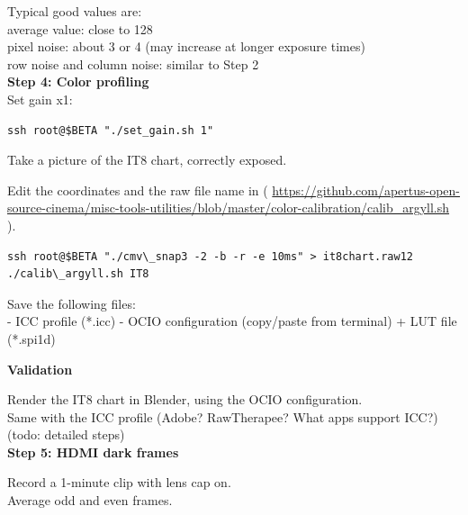 Typical good values are:\\

average value: close to 128\\

pixel noise: about 3 or 4 (may increase at longer exposure times)\\

row noise and column noise: similar to Step 2\\

\textbf{Step 4: Color profiling}\\

Set gain x1:

\begin{lstlisting}[breaklines=true, breakatwhitespace=true]
ssh root@$BETA "./set_gain.sh 1"
\end{lstlisting} 

Take a picture of the IT8 chart, correctly exposed.

Edit the coordinates and the raw file name in  ( \href{https://github.com/apertus-open-source-cinema/misc-tools-utilities/blob/master/color-calibration/calib_argyll.sh}{https://github.com/apertus-open-source-cinema/misc-tools-utilities/blob/master/color-calibration/calib\_argyll.sh} ). 

\begin{lstlisting}[breaklines=true, breakatwhitespace=true]
ssh root@$BETA "./cmv\_snap3 -2 -b -r -e 10ms" > it8chart.raw12
./calib\_argyll.sh IT8
\end{lstlisting} 

Save the following files:\\

- ICC profile (*.icc)
- OCIO configuration (copy/paste from terminal) + LUT file (*.spi1d) 

\textbf{Validation}

Render the IT8 chart in Blender, using the OCIO configuration.\\

Same with the ICC profile (Adobe? RawTherapee? What apps support ICC?)\\

(todo: detailed steps)\\

\textbf{Step 5: HDMI dark frames }

Record a 1-minute clip with lens cap on.\\

Average odd and even frames.\\

